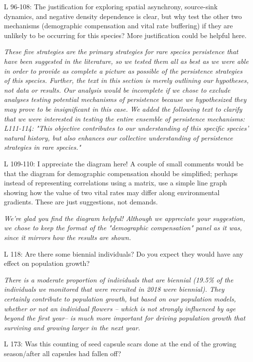 \documentclass[12pt, letterpaper]{article}
\begin{document}
\begin{flushleft}
L 96-108: The justification for exploring spatial asynchrony, source-sink dynamics, and negative density dependence is clear, but why test the other two mechanisms (demographic compensation and vital rate buffering) if they are unlikely to be occurring for this species? More justification could be helpful here.

\textit{These five strategies are the primary strategies for rare species persistence that have been suggested in the literature, so we tested them all as best as we were able in order to provide as complete a picture as possible of the persistence strategies of this species. 
Further, the text in this section is merely outlining our hypotheses, not data or results. Our analysis would be incomplete if we chose to exclude analyses testing potential mechanisms of persistence because we hypothesized they may prove to be insignificant in this case. We added the following text to clarify that we were interested in testing the entire ensemble of persistence mechanisms: L111-114: "This objective contributes to our understanding of this specific species' natural history, but also enhances our collective understanding of persistence strategies in rare species."}

L 109-110: I appreciate the diagram here! A couple of small comments would be that the diagram for demographic compensation should be simplified; perhaps instead of representing correlations using a matrix, use a simple line graph showing how the value of two vital rates may differ along environmental gradients. These are just suggestions, not demands.

\textit{We're glad you find the diagram helpful! Although we appreciate your suggestion, we chose to keep the format of the "demographic compensation" panel as it was, since it mirrors how the results are shown. }

L 118: Are there some biennial individuals? Do you expect they would have any effect on population growth? 

\textit{There is a moderate proportion of individuals that are biennial (19.5\% of the individuals we monitored that were recruited in 2018 were biennial). They certainly contribute to population growth, but based on our population models, whether or not an individual flowers -- which is not strongly influenced by age beyond the first year-- is much more important for driving population growth that surviving and growing larger in the next year. }

L 173: Was this counting of seed capsule scars done at the end of the growing season/after all capsules had fallen off?


\end{flushleft}
\end{document}
